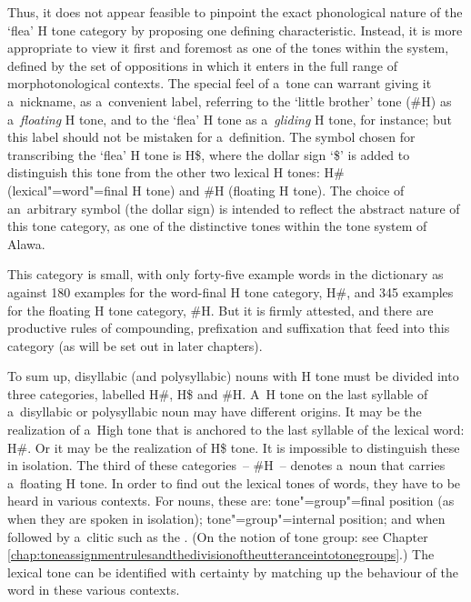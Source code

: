 Thus, it does not appear feasible to pinpoint the exact phonological nature of the ‘flea’ H tone category by proposing one defining characteristic. Instead, it is more appropriate to view it first and foremost as one of the tones within the system, defined by the set of oppositions in which it enters in the full range of morphotonological contexts. The special feel of a~tone can warrant giving it a~nickname, as a~convenient label, referring to the ‘little brother’ tone (\#H) as a~\textit{floating} H tone, and to the ‘flea’ H tone as a~\textit{gliding} H tone, for instance; but this label should not be mistaken for a~definition. The symbol chosen for transcribing the ‘flea’ H tone is H\$, where the dollar sign ‘\$’ is added to distinguish this tone from the other two lexical H tones: H\# (lexical"=word"=final H tone) and \#H (floating H tone). The choice of an~arbitrary symbol (the dollar sign) is intended to reflect the abstract nature of this tone category, as one of the distinctive tones within the tone system of Alawa. 

This category is small, with only forty-five example words in the dictionary \citep{michauddict2015} as against 180 examples for the word-final H tone category, H\#, and 345 examples for the floating H tone category, \#H. But it is firmly attested, and there are productive rules of compounding, prefixation and suffixation that feed into this category (as will be set out in later chapters). 

To sum up, disyllabic (and polysyllabic) nouns with H tone must be divided into three categories,
labelled H\#, H\$ and \#H. A~H tone on the last
syllable of a~disyllabic or polysyllabic noun may have different origins. It may be the realization
of a~High tone that is {anchored} to the last syllable of the lexical word: H\#. Or it may be the realization of H\$ tone. It is
impossible to distinguish these in isolation. The third of these
categories~-- \#H~-- denotes a~noun that carries a~floating H tone. In order to find out the
lexical tones of words, they have to be heard in various contexts. For nouns, these are:
tone"=group"=final position (as when they are spoken in isolation); tone"=group"=internal position; and
when followed by a~clitic such as the . (On the notion of {tone group}: see Chapter \ref{chap:toneassignmentrulesandthedivisionoftheutteranceintotonegroups}.) The lexical tone can be identified with
certainty by matching up the behaviour of the word in these various contexts.

